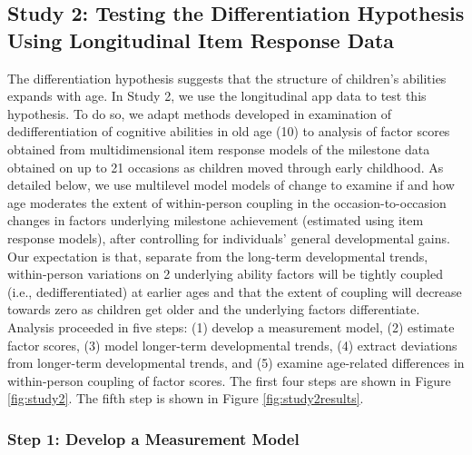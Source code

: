 \documentclass[man]{apa7}
\begin{document}
\subsection*{Study 2: Testing the Differentiation Hypothesis Using Longitudinal Item Response Data}

The differentiation hypothesis suggests that the structure of children's
abilities expands with age. In Study 2, we use the longitudinal app data
to test this hypothesis. To do so, we adapt methods developed in
examination of dedifferentiation of cognitive abilities in old age (10)
to analysis of factor scores obtained from multidimensional item
response models of the milestone data obtained on up to 21 occasions as
children moved through early childhood. As detailed below, we use
multilevel model models of change to examine if and how age moderates
the extent of within-person coupling in the occasion-to-occasion changes
in factors underlying milestone achievement (estimated using item
response models), after controlling for individuals' general
developmental gains. Our expectation is that, separate from the
long-term developmental trends, within-person variations on 2 underlying
ability factors will be tightly coupled (i.e., dedifferentiated) at
earlier ages and that the extent of coupling will decrease towards zero
as children get older and the underlying factors differentiate. Analysis
proceeded in five steps: (1) develop a measurement model, (2) estimate
factor scores, (3) model longer-term developmental trends, (4) extract
deviations from longer-term developmental trends, and (5) examine
age-related differences in within-person coupling of factor scores. The
first four steps are shown in Figure \ref{fig:study2}. The fifth step is
shown in Figure \ref{fig:study2results}.

\hypertarget{step-1-develop-a-measurement-model}{%
\subsubsection*{Step 1: Develop a Measurement
Model}\label{step-1-develop-a-measurement-model}}
\end{document}
